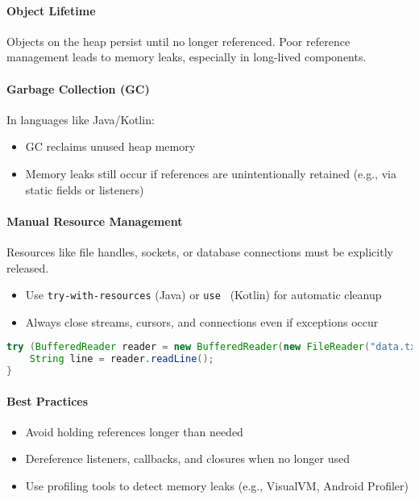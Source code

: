 \documentclass[a4paper,12pt]{article}
\begin{document}
\paragraph{Object Lifetime}
Objects on the heap persist until no longer referenced. Poor reference management leads to memory leaks, especially in long-lived components.

\paragraph{Garbage Collection (GC)}
In languages like Java/Kotlin:
\begin{itemize}
  \item GC reclaims unused heap memory
  \item Memory leaks still occur if references are unintentionally retained (e.g., via static fields or listeners)
\end{itemize}

\paragraph{Manual Resource Management}
Resources like file handles, sockets, or database connections must be explicitly released.

\begin{itemize}
  \item Use \texttt{try-with-resources} (Java) or \texttt{use {}} (Kotlin) for automatic cleanup
  \item Always close streams, cursors, and connections even if exceptions occur
\end{itemize}

\begin{lstlisting}[language=Java]
try (BufferedReader reader = new BufferedReader(new FileReader("data.txt"))) {
    String line = reader.readLine();
}
\end{lstlisting}

\paragraph{Best Practices}
\begin{itemize}
  \item Avoid holding references longer than needed
  \item Dereference listeners, callbacks, and closures when no longer used
  \item Use profiling tools to detect memory leaks (e.g., VisualVM, Android Profiler)
\end{itemize}
\end{document}
